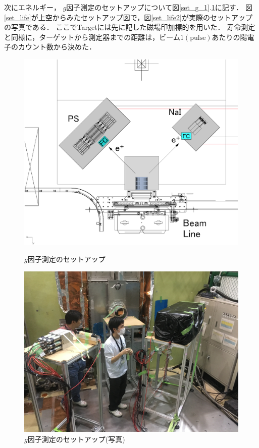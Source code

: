 次にエネルギー， $g$因子測定のセットアップについて図\ref{set_g_1}.\ref{set_g_2}に記す．
図\ref{set_life}が上空からみたセットアップ図で，図\ref{set_life2}が実際のセットアップの写真である．
ここでTargetには先に記した磁場印加標的を用いた．
寿命測定と同様に，ターゲットから測定器までの距離は，ビーム$1(\mathrm{pulse})$あたりの陽電子のカウント数から決めた．
\begin{figure}[H]
  \begin{minipage}{0.45\hsize}
    \begin{center}
      \includegraphics[width=1\textwidth]{figure/tajima/g-2_3.png}
      \caption{$g$因子測定のセットアップ}
      \label{set_g_1}
    \end{center}
  \end{minipage}
  \begin{minipage}{0.45\hsize}
    \begin{center}
      \includegraphics[width=1.1\textwidth]{figure/tajima/g.jpg}
      \caption{$g$因子測定のセットアップ(写真)}
      \label{set_g_2}
    \end{center}
  \end{minipage}
\end{figure}
